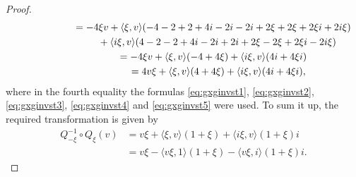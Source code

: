 \documentclass[pdftex]{sigma}
\numberwithin{equation}{section}
\begin{document}
\begin{proof}
\begin{gather*}
\hphantom{4 Q_{-\xi}^{-1}\circ Q_\xi(v)}{} =-4\xi v+ \langle \xi,v\rangle (-4-2+2+4i-2i-2i+2\xi+2\xi+2\xi i+2i\xi)\\
\hphantom{4 Q_{-\xi}^{-1}\circ Q_\xi(v) =}{} +\langle i\xi,v\rangle(4-2-2+4i-2i+2i+2\xi-2\xi+2\xi i-2 i\xi)\\
\hphantom{4 Q_{-\xi}^{-1}\circ Q_\xi(v)}{} = -4\xi v+ \langle \xi,v\rangle(-4+4\xi)+ \langle i \xi,v\rangle(4i+4\xi i)\\
\hphantom{4 Q_{-\xi}^{-1}\circ Q_\xi(v) =}{} = 4v \xi+ \langle \xi,v\rangle(4+4\xi)+ \langle i \xi,v\rangle(4i+4\xi i),
\end{gather*}
 where in the fourth equality the formulas \eqref{eq:gxginvst1}, \eqref{eq:gxginvst2}, \eqref{eq:gxginvst3}, \eqref{eq:gxginvst4} and \eqref{eq:gxginvst5} were used.
 To sum it up, the required transformation is given by
\begin{align*}
 Q_{-\xi}^{-1}\circ Q_\xi(v)&= v \xi+ \langle \xi,v\rangle(1+\xi)+ \langle i \xi,v\rangle(1+\xi)i\\
 &=v \xi- \langle v \xi,1\rangle(1+\xi)- \langle v\xi ,i\rangle(1+\xi)i.\tag*{\qed}
 \end{align*}\renewcommand{\qed}{}
\end{proof}
\end{document}
